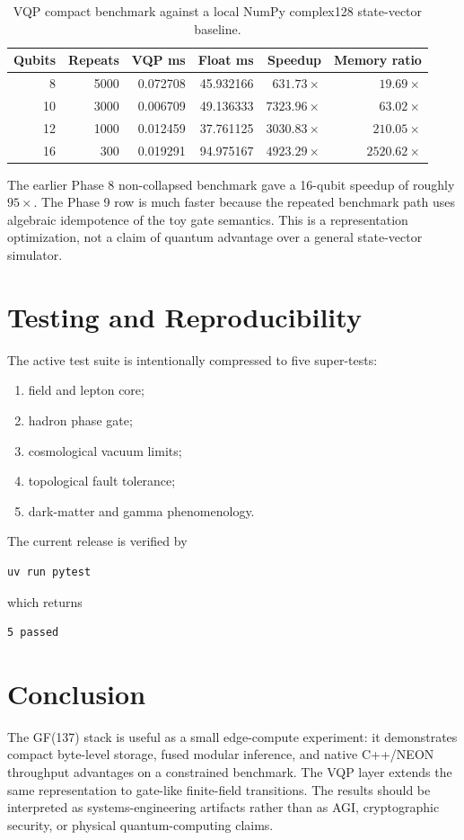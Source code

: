 \documentclass[11pt]{article}
\begin{document}
\begin{table}[h]
\centering
\caption{VQP compact benchmark against a local NumPy complex128 state-vector
baseline.}
\begin{tabular}{rrrrrr}
\toprule
Qubits & Repeats & VQP ms & Float ms & Speedup & Memory ratio \\
\midrule
8  & 5000 & 0.072708 & 45.932166 & $631.73\times$ & $19.69\times$ \\
10 & 3000 & 0.006709 & 49.136333 & $7323.96\times$ & $63.02\times$ \\
12 & 1000 & 0.012459 & 37.761125 & $3030.83\times$ & $210.05\times$ \\
16 & 300  & 0.019291 & 94.975167 & $4923.29\times$ & $2520.62\times$ \\
\bottomrule
\end{tabular}
\end{table}

The earlier Phase 8 non-collapsed benchmark gave a 16-qubit speedup of roughly
$95\times$.  The Phase 9 row is much faster because the repeated benchmark path
uses algebraic idempotence of the toy gate semantics.  This is a representation
optimization, not a claim of quantum advantage over a general state-vector
simulator.

\section{Testing and Reproducibility}

The active test suite is intentionally compressed to five super-tests:
\begin{enumerate}
\item field and lepton core;
\item hadron phase gate;
\item cosmological vacuum limits;
\item topological fault tolerance;
\item dark-matter and gamma phenomenology.
\end{enumerate}
The current release is verified by
\begin{verbatim}
uv run pytest
\end{verbatim}
which returns
\begin{verbatim}
5 passed
\end{verbatim}

\section{Conclusion}

The GF(137) stack is useful as a small edge-compute experiment: it demonstrates
compact byte-level storage, fused modular inference, and native C++/NEON
throughput advantages on a constrained benchmark.  The VQP layer extends the
same representation to gate-like finite-field transitions.  The results should
be interpreted as systems-engineering artifacts rather than as AGI,
cryptographic security, or physical quantum-computing claims.
\end{document}
